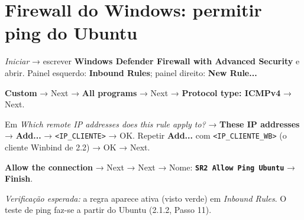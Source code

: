 
\section[Firewall do Windows: permitir ping do Ubuntu]{Firewall do Windows: permitir ping do Ubuntu}


\emph{Iniciar} → escrever \textbf{Windows Defender Firewall with Advanced Security} e abrir. Painel esquerdo: \textbf{Inbound Rules}; painel direito: \textbf{New Rule...}


\textbf{Custom} → Next → \textbf{All programs} → Next → \textbf{Protocol type: ICMPv4} → Next.


Em \emph{Which remote IP addresses does this rule apply to?} → \textbf{These IP addresses} → \textbf{Add...} → \texttt{\textless{}IP\_CLIENTE\textgreater{}} → OK. Repetir \textbf{Add...} com \texttt{\textless{}IP\_CLIENTE\_WB\textgreater{}} (o cliente Winbind de 2.2) → OK → Next.


\textbf{Allow the connection} → Next → Next → Nome: \textbf{\texttt{SR2 Allow Ping Ubuntu}} → \textbf{Finish}.

\emph{Verificação esperada:} a regra aparece ativa (visto verde) em \emph{Inbound Rules}. O teste de ping faz-se a partir do Ubuntu (2.1.2, Passo 11).

